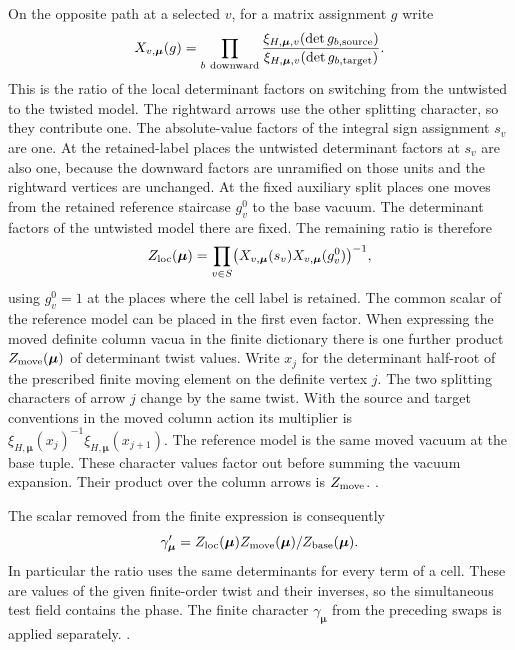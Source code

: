 On the opposite path at a selected \(v\), for a matrix
assignment \(g\) write
\[
 X_{v,\boldsymbol\mu}(g)=
   \prod_{b\ {\rm downward}}
     \frac{\xi_{H,\boldsymbol\mu,v}(\det g_{b,\mathrm{source}})}
          {\xi_{H,\boldsymbol\mu,v}(\det g_{b,\mathrm{target}})} .
\]
This is the ratio of the local determinant factors on switching
from the untwisted to the twisted model. The rightward arrows
use the other splitting character, so they contribute one.
The absolute-value factors of the integral sign assignment
\(s_v\) are one. At the retained-label places the untwisted determinant factors at
\(s_v\) are also one, because the downward factors are unramified
on those units and the rightward vertices are unchanged. At the fixed auxiliary
split places one moves from the retained reference staircase \(g^0_v\)
to the base vacuum. The determinant factors of the untwisted
model there are fixed. The remaining ratio is therefore
\[
 Z_{\rm loc}(\boldsymbol\mu)=
    \prod_{v\in S}\bigl(X_{v,\boldsymbol\mu}(s_v)
                        X_{v,\boldsymbol\mu}(g^0_v)\bigr)^{-1},
\]
using \(g^0_v=1\) at the places where the cell label is retained.
The common scalar of the reference model can be placed in the
first even factor. When expressing the moved definite column
vacua in the finite dictionary there is one further product
\(Z_{\rm move}(\boldsymbol\mu)\) of determinant twist values.
Write \(x_j\) for the determinant half-root of the prescribed
finite moving element on the definite vertex \(j\). The two
splitting characters of arrow \(j\) change by the same twist.
With the source and target conventions in the moved column
action its multiplier is
\(\xi_{H,\boldsymbol\mu}(x_j)^{-1}
   \xi_{H,\boldsymbol\mu}(x_{j+1})\).
The reference model is the same moved vacuum at the base
tuple. These character values factor out before summing the
vacuum expansion. Their product over the column arrows is
\(Z_{\rm move}\).
.

The scalar removed from the finite expression is consequently
\[
 \gamma'_{\boldsymbol\mu}
   =Z_{\rm loc}(\boldsymbol\mu)Z_{\rm move}(\boldsymbol\mu)/
                      Z_{\rm base}(\boldsymbol\mu).
\]
In particular the ratio uses the same determinants for every term
of a cell. These are values of the given finite-order twist and
their inverses, so the simultaneous test field contains the
phase. The finite character \(\gamma_{\boldsymbol\mu}\) from the
preceding swaps is applied separately.
.

